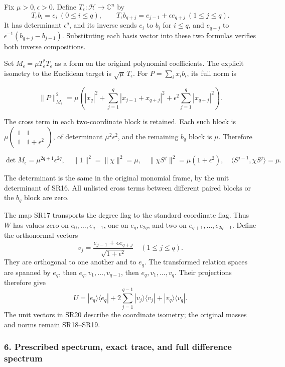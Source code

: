 \documentclass{article}
\begin{document}
Fix \(\mu>0,\epsilon>0\). Define \(T_\epsilon:\mathcal H\to\mathbb C^n\) by \[
T_\epsilon b_i=e_i\ (0\le i\le q),\qquad
T_\epsilon b_{q+j}=e_{j-1}+\epsilon e_{q+j}\ (1\le j\le q).
\tag{SR17}
\] It has determinant \(\epsilon^q\), and its inverse sends \(e_i\) to \(b_i\) for \(i\le q\), and \(e_{q+j}\) to \(\epsilon^{-1}(b_{q+j}-b_{j-1})\). Substituting each basis vector into these two formulas verifies both inverse compositions.

Set \(M_\epsilon=\mu T_\epsilon^*T_\epsilon\) as a form on the original polynomial coefficients. The explicit isometry to the Euclidean target is \(\sqrt\mu\,T_\epsilon\). For \(P=\sum_i x_ib_i\), its full norm is

\[
\|P\|_{M_\epsilon}^2
=\mu\left(
|x_q|^2+\sum_{j=1}^q|x_{j-1}+x_{q+j}|^2
+\epsilon^2\sum_{j=1}^q|x_{q+j}|^2\right).
\tag{SR18}
\]

The cross term in each two-coordinate block is retained. Each such block is \(\mu\begin{pmatrix}1&1\\1&1+\epsilon^2\end{pmatrix}\), of determinant \(\mu^2\epsilon^2\), and the remaining \(b_q\) block is \(\mu\). Therefore

\[
\det M_\epsilon=\mu^{2q+1}\epsilon^{2q},\quad
\|1\|^2=\|\chi\|^2=\mu,\quad
\|\chi S^j\|^2=\mu(1+\epsilon^2),\quad
\langle S^{j-1},\chi S^j\rangle=\mu.
\tag{SR19}
\]

The determinant is the same in the original monomial frame, by the unit determinant of SR16. All unlisted cross terms between different paired blocks or the \(b_q\) block are zero.

The map SR17 transports the degree flag to the standard coordinate flag. Thus \(W\) has values zero on \(e_0,\ldots,e_{q-1}\), one on \(e_q,e_{2q}\), and two on \(e_{q+1},\ldots,e_{2q-1}\). Define the orthonormal vectors \[
v_j=\frac{e_{j-1}+\epsilon e_{q+j}}{\sqrt{1+\epsilon^2}}
\quad(1\le j\le q).
\tag{SR20}
\] They are orthogonal to one another and to \(e_q\). The transformed relation spaces are spanned by \(e_q\), then \(e_q,v_1,\ldots,v_{q-1}\), then \(e_q,v_1,\ldots,v_q\). Their projections therefore give \[
U=|e_q\rangle\langle e_q|
+2\sum_{j=1}^{q-1}|v_j\rangle\langle v_j|
+|v_q\rangle\langle v_q|.
\tag{SR21}
\] The unit vectors in SR20 describe the coordinate isometry; the original masses and norms remain SR18--SR19.

\subsubsection{6. Prescribed spectrum, exact trace, and full difference spectrum}\label{endpoint-four_window_sharpness_review--prescribed-spectrum-exact-trace-and-full-difference-spectrum}
\end{document}
